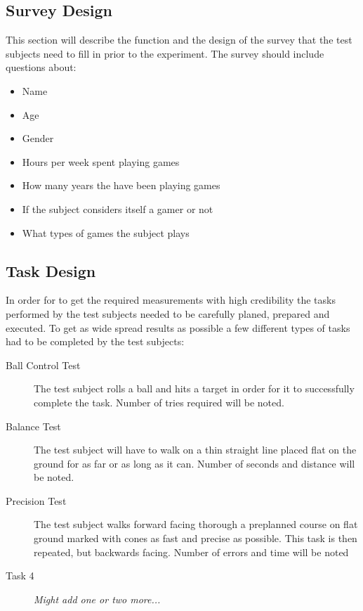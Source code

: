 \documentclass[runningheads,a4paper,oribibl]{llncs}
\begin{document}
\subsection{Survey Design}

This section will describe the function and the design of the survey that the test subjects need to fill in prior to the experiment. The survey should include questions about:
\begin{itemize}
	\item Name
	\item Age
	\item Gender
	\item Hours per week spent playing games
	\item How many years the have been playing games
	\item If the subject considers itself a gamer or not
	\item What types of games the subject plays
\end{itemize}











\subsection{Task Design}
In order for to get the required measurements with high credibility the tasks performed by the test subjects needed to be carefully planed, prepared and executed. To get as wide spread results as possible a few different types of tasks had to be completed by the test subjects:

\begin{description}
   \item[Ball Control Test] The test subject rolls a ball and hits a target in order for it to successfully complete the task. Number of tries required will be noted.
   \item[Balance Test] The test subject will have to walk on a thin straight line placed flat on the ground for as far or as long as it can. Number of seconds and distance will be noted.
   \item[Precision Test] The test subject walks forward facing thorough a preplanned course on flat ground marked with cones as fast and precise as possible. This task is then repeated, but backwards facing. Number of errors and time will be noted
   \item[Task 4] \emph{Might add one or two more...}
\end{description}
\end{document}
